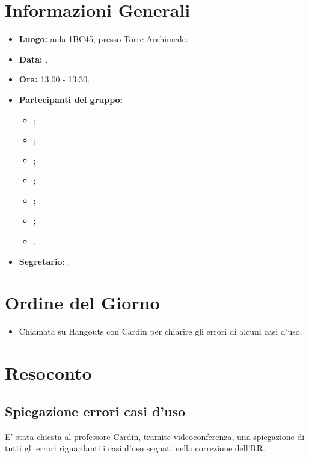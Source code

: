 \section{Informazioni Generali}
\begin{itemize}
\item \textbf{Luogo:} aula 1BC45, presso Torre Archimede.
\item \textbf{Data:} \Data.
\item \textbf{Ora:} 13:00 - 13:30.
\item \textbf{Partecipanti del gruppo:}
	\begin{itemize}
		\item \AT{}; 
		\item \CE{}; 
		\item \DF{};
		\item \LD{};
		\item \MC{};
		\item \PF{};
		\item \SE{}.
	\end{itemize} 
\item \textbf{Segretario:} \SE{}.
\end{itemize}

\section{Ordine del Giorno}
\begin{itemize}
	\item Chiamata su Hangouts con Cardin per chiarire gli errori di alcuni casi d'uso.
\end{itemize}


\section{Resoconto}
\subsection{Spiegazione errori casi d'uso}
E' stata chiesta al professore Cardin, tramite videoconferenza, una spiegazione di tutti gli errori riguardanti i casi d'uso segnati nella correzione dell'RR.\\

\clearpage